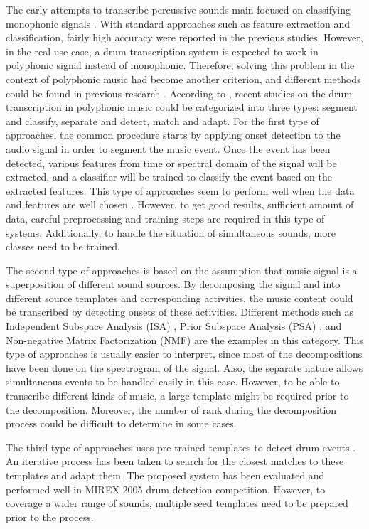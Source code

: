 \documentclass{article}
\begin{document}
The early attempts to transcribe percussive sounds main focused on classifying monophonic signals \cite{6,7}. With standard approaches such as feature extraction and classification, fairly high accuracy were reported in the previous studies. However, in the real use case, a drum transcription system is expected to work in polyphonic signal instead of monophonic. Therefore, solving this problem in the context of polyphonic music had become another criterion, and different methods could be found in previous research \cite{8,9,10,11,12,13,14,15}.  According to \cite{15}, recent studies on the drum transcription in polyphonic music could be categorized into three types: segment and classify, separate and detect, match and adapt.  For the first type of approaches, the common procedure starts by applying onset detection to the audio signal in order to segment the music event. Once the event has been detected, various features from time or spectral domain of the signal will be extracted, and a classifier will be trained to classify the event based on the extracted features. This type of approaches seem to perform well when the data and features are well chosen \cite{13,15}. However, to get good results, sufficient amount of data, careful preprocessing and training steps are required in this type of systems. Additionally, to handle the situation of simultaneous sounds, more classes need to be trained.

The second type of approaches is based on the assumption that music signal is a superposition of different sound sources. By decomposing the signal and into different source templates and corresponding activities, the music content could be transcribed by detecting onsets of these activities. Different methods such as Independent Subspace Analysis (ISA) \cite{16}, Prior Subspace Analysis (PSA) \cite{8}, and Non-negative Matrix Factorization (NMF) \cite{14,17,18} are the examples in this category. This type of approaches is usually easier to interpret, since most of the decompositions have been done on the spectrogram of the signal. Also, the separate nature allows simultaneous events to be handled easily in this case. However, to be able to transcribe different kinds of music, a large template might be required prior to the decomposition. Moreover, the number of rank during the decomposition process could be difficult to determine in some cases. 

The third type of approaches uses pre-trained templates to detect drum events \cite{19,20}. An iterative process has been taken to search for the closest matches to these templates and adapt them. The proposed system has been evaluated and performed well in MIREX 2005 drum detection competition. However, to coverage a wider range of sounds, multiple seed templates need to be prepared prior to the process.
\end{document}
